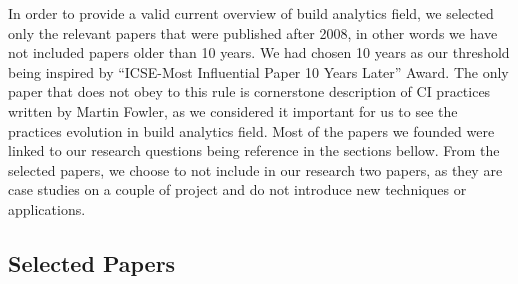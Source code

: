 \documentclass[]{book}
\begin{document}
In order to provide a valid current overview of build analytics field,
we selected only the relevant papers that were published after 2008, in
other words we have not included papers older than 10 years. We had
chosen 10 years as our threshold being inspired by ``ICSE-Most
Influential Paper 10 Years Later'' Award. The only paper that does not
obey to this rule is cornerstone description of CI practices written by
Martin Fowler, as we considered it important for us to see the practices
evolution in build analytics field. Most of the papers we founded were
linked to our research questions being reference in the sections bellow.
From the selected papers, we choose to not include in our research two
papers, as they are case studies on a couple of project and do not
introduce new techniques or applications.

\subsection{Selected Papers}\label{selected-papers}
\end{document}
